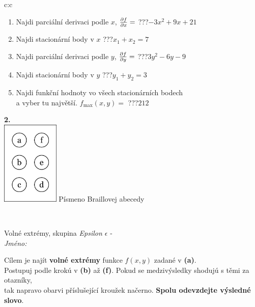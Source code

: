 \documentclass[10pt]{report}
\begin{document}
\begin{tabular}{c:c}
\begin{minipage}[c][104.5mm][t]{0.5\linewidth}
\begin{center}
\begin{minipage}{0.79\linewidth}
\begin{center}
\begin{varwidth}{\linewidth}
\begin{enumerate}
\item Najdi parciální derivaci podle $x$, $\pdv{f}{x}=$\quad \dotfill\; ???\;\dotfill \quad $-3x^2+9x+21$
\item Najdi stacionární body v $x$\quad \dotfill\; ???\;\dotfill \quad $x_1+x_2=7$
\item Najdi parciální derivaci podle $y$, $\pdv{f}{y}=$\quad \dotfill\; ???\;\dotfill \quad $3y^2-6y-9$
\item Najdi stacionární body v $y$\quad \dotfill\; ???\;\dotfill \quad $y_1+y_2=3$
\item Najdi funkční hodnoty vo všech stacionárních bodech \\ \phantom{xxxxxx} a vyber tu najvětší. $f_{\text{max}}(x,y)=$\quad \dotfill\; ???\;\dotfill \quad $212$
\end{enumerate}
\end{varwidth}
\end{center}
\end{minipage}
\begin{minipage}{0.20\linewidth}
\begin{center}
{\Huge\bfseries 2.} \\[2mm]
\includegraphics[height=40mm]{../images/braille.png}
{\small Písmeno Braillovej abecedy}
\end{center}
\end{minipage}
\end{center}
\end{minipage}
\\ \hdashline
\begin{minipage}[c][104.5mm][t]{0.5\linewidth}
\begin{center}
\vspace{7mm}
{\huge Volné extrémy, skupina \textit{Epsilon $\epsilon$} -}\\[5mm]
\textit{Jméno:}\phantom{xxxxxxxxxxxxxxxxxxxxxxxxxxxxxxxxxxxxxxxxxxxxxxxxxxxxxxxxxxxxxxxxx}\\[5mm]
\begin{minipage}{0.95\linewidth}
\begin{center}
Cílem je najít \textbf{volné extrémy} funkce $f(x,y)$ zadané v \textbf{(a)}.\\Postupuj podle krokú v \textbf{(b)} až \textbf{(f)}. Pokud se medzivýsledky shodujú s těmi za otazníky,\\tak napravo obarvi příslušející kroužek načerno. \textbf{Spolu odevzdejte výsledné slovo}.

\end{center}
\end{minipage}
\end{center}
\end{minipage}
\end{tabular}
\end{document}
